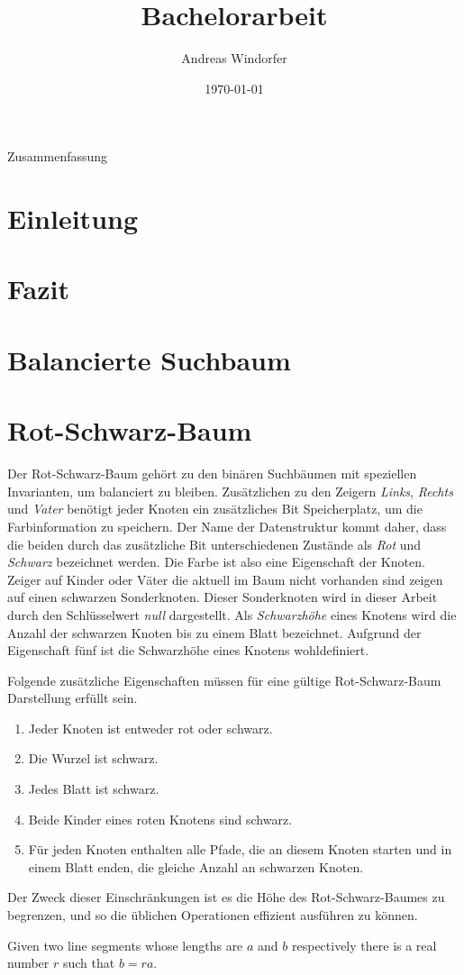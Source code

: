 \documentclass[a4paper,12pt]{article}
\title{Bachelorarbeit}
\author{

	Andreas Windorfer\\
}
\date{\today}
\begin{document}
\maketitle
\newpage
Zusammenfassung
\newpage
\tableofcontents


\newpage

\section {Einleitung}
\section{Fazit}
\section{Balancierte Suchbaum}
\section{Rot-Schwarz-Baum}
Der Rot-Schwarz-Baum gehört zu den binären Suchbäumen mit speziellen Invarianten, um balanciert zu bleiben. Zusätzlichen zu den Zeigern  \textit{Links}, \textit{Rechts} und \textit{Vater} benötigt jeder Knoten ein zusätzliches Bit Speicherplatz, um die Farbinformation zu speichern. Der Name der Datenstruktur kommt daher, dass die beiden durch das zusätzliche Bit unterschiedenen Zustände als \textit{Rot} und \textit{Schwarz} bezeichnet werden. Die Farbe ist also eine Eigenschaft der Knoten. Zeiger auf Kinder oder Väter die aktuell im Baum nicht vorhanden sind zeigen auf einen schwarzen Sonderknoten. Dieser Sonderknoten wird in dieser Arbeit durch den Schlüsselwert  \textit{null} dargestellt. Als \textit{Schwarzhöhe} eines Knotens wird die Anzahl der schwarzen Knoten bis zu einem Blatt bezeichnet. Aufgrund der Eigenschaft fünf ist die Schwarzhöhe eines Knotens wohldefiniert.


\noindent Folgende zusätzliche Eigenschaften müssen für eine gültige Rot-Schwarz-Baum Darstellung erfüllt sein. 

\begin{enumerate}
	\item Jeder Knoten ist entweder rot oder schwarz.
	\item Die Wurzel ist schwarz.
	\item Jedes Blatt ist schwarz.
	\item Beide Kinder eines roten Knotens sind schwarz.
	\item Für jeden Knoten enthalten alle Pfade, die an diesem Knoten starten und in einem Blatt enden, die gleiche Anzahl an schwarzen Knoten. 
\end{enumerate}  

\noindent  Der Zweck dieser Einschränkungen ist es die Höhe des Rot-Schwarz-Baumes zu begrenzen, und so die üblichen Operationen effizient ausführen zu können.

\begin{lemma}
	Given two line segments whose lengths are $a$ and $b$ respectively there is a 
	real number $r$ such that $b=ra$.
\end{lemma}



\newpage


\end{document}
